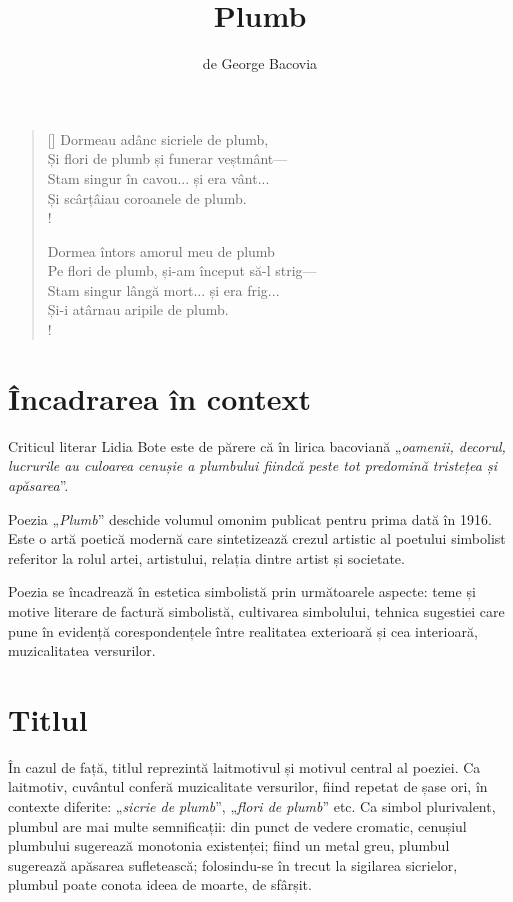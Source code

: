 \documentclass{article}
\title{Plumb}
\author{de George Bacovia}
\date{}
\newcommand{\qu}[1]{„\emph{#1}”}
\begin{document}
\maketitle

\settowidth{\versewidth}{Pe flori de plumb, și-am început să-l strig---}
\begin{verse}[\versewidth]
Dormeau adânc sicriele de plumb, \\
Și flori de plumb și funerar veștmânt--- \\
Stam singur în cavou... și era vânt... \\
Și scârțâiau coroanele de plumb. \\!

Dormea întors amorul meu de plumb \\
Pe flori de plumb, și-am început să-l strig--- \\
Stam singur lângă mort... și era frig... \\
Și-i atârnau aripile de plumb. \\!
\end{verse}

\section{Încadrarea în context}
Criticul literar Lidia Bote este de părere că în lirica bacoviană \qu{oamenii, decorul, lucrurile au culoarea cenușie a plumbului fiindcă peste tot predomină tristețea și apăsarea}.

Poezia \qu{Plumb} deschide volumul omonim publicat pentru prima dată în 1916. Este o artă poetică modernă care sintetizează crezul artistic al poetului simbolist referitor la rolul artei, artistului, relația dintre artist și societate.

Poezia se încadrează în estetica simbolistă prin următoarele aspecte: teme și motive literare de factură simbolistă, cultivarea simbolului, tehnica sugestiei care pune în evidență corespondențele între realitatea exterioară și cea interioară, muzicalitatea versurilor.

\section{Titlul}
În cazul de față, titlul reprezintă laitmotivul și motivul central al poeziei. Ca laitmotiv, cuvântul conferă muzicalitate versurilor, fiind repetat de șase ori, în contexte diferite: \qu{sicrie de plumb}, \qu{flori de plumb} etc. Ca simbol plurivalent, plumbul are mai multe semnificații: din punct de vedere cromatic, cenușiul plumbului sugerează monotonia existenței; fiind un metal greu, plumbul sugerează apăsarea sufletească; folosindu-se în trecut la sigilarea sicrielor, plumbul poate conota ideea de moarte, de sfârșit.
\end{document}
